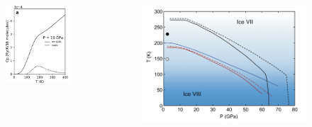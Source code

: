 \documentclass[13pt,aspectratio=169]{beamer}
\newcommand*{\RMN}[1]{\uppercase\expandafter{\romannumeral#1}}
\begin{document}
\begin{frame}{\subsecname{} \RMN{3}}
	\begin{columns}
		\begin{column}{0.4\textwidth}
			\begin{figure}[t]
				\includegraphics[width=\columnwidth]{images/cp}%
			\end{figure}
		\end{column}
		\hfill
		\setcounter{footnote}{1}
		\begin{column}{0.5\textwidth}
			\begin{figure}[t]
				\includegraphics[width=\columnwidth]{images/boundary}%

\end{figure}
\end{column}
\end{columns}
\end{frame}
\end{document}
